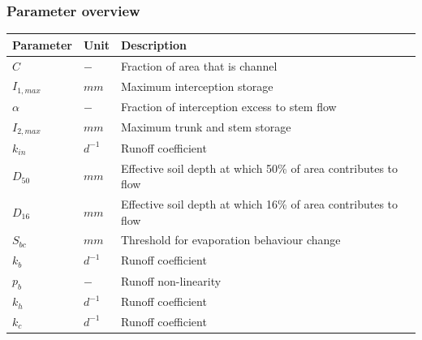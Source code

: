 \newpage
\subsubsection{Parameter overview}
\begin{table}[htbp]
  \centering
    \begin{tabular}{lll}
    \toprule
    Parameter & Unit  & Description \\
    \midrule
    $C$   & $-$   & Fraction of area that is channel \\
    $I_{1,max}$ & $mm$  & Maximum interception storage \\
    $\alpha$ & $-$   & Fraction of interception excess to stem flow \\
    $I_{2,max}$ & $mm$  & Maximum trunk and stem storage \\
    $k_{in}$ & $d^{-1}$ & Runoff coefficient \\
    $D_{50}$ & $mm$  & Effective soil depth at which 50\% of area contributes to flow \\
    $D_{16}$ & $mm$  & Effective soil depth at which 16\% of area contributes to flow \\
    $S_{bc}$ & $mm$  & Threshold for evaporation behaviour change \\
    $k_b$ & $d^{-1}$ & Runoff coefficient \\
    $p_b$ & $-$   & Runoff non-linearity \\
    $k_h$ & $d^{-1}$ & Runoff coefficient \\
    $k_c$ & $d^{-1}$ & Runoff coefficient \\
    \bottomrule
    \end{tabular}%
  \label{tab:addlabel}%
\end{table}%

